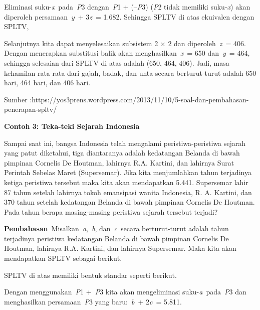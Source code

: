 \documentclass[11pt,fleqn]{book} %
\begin{document}
\begin{myEnumerate}
\begin{itemize}
\noindent 

\noindent 

\noindent Eliminasi suku-\textit{x}~pada~\textit{P}3 dengan~\textit{P}1 + (--\textit{P}3) (\textit{P}2 tidak memiliki suku-\textit{x}) akan diperoleh persamaan~\textit{y}~+ 3\textit{z}~= 1.682. Sehingga SPLTV di atas ekuivalen dengan SPLTV,

\noindent 

\noindent 

\noindent Selanjutnya kita dapat menyelesaikan subsistem 2 $\times$ 2 dan diperoleh~\textit{z}~= 406. Dengan menerapkan substitusi balik akan menghasilkan~\textit{x}~= 650 dan~\textit{y}~= 464, sehingga selesaian dari SPLTV di atas adalah (650, 464, 406). Jadi, masa kehamilan rata-rata dari gajah, badak, dan unta secara berturut-turut adalah 650 hari, 464 hari, dan 406 hari.

\noindent Sumber :https://yos3prens.wordpress.com/2013/11/10/5-soal-dan-pembahasan-penerapan-spltv/

\noindent 

\noindent \textbf{Contoh 3: Teka-teki Sejarah Indonesia}

\noindent Sampai saat ini, bangsa Indonesia telah mengalami peristiwa-peristiwa sejarah yang patut diketahui, tiga diantaranya adalah kedatangan Belanda di bawah pimpinan Cornelis De Houtman, lahirnya R.A. Kartini, dan lahirnya Surat Perintah Sebelas Maret (Supersemar). Jika kita menjumlahkan tahun terjadinya ketiga peristiwa tersebut maka kita akan mendapatkan 5.441. Supersemar lahir 87 tahun setelah lahirnya tokoh emansipasi wanita Indonesia, R. A. Kartini, dan 370 tahun setelah kedatangan Belanda di bawah pimpinan Cornelis De Houtman. Pada tahun berapa masing-masing peristiwa sejarah tersebut terjadi?

\noindent 

\noindent \textbf{Pembahasan}~Misalkan~\textit{a},~\textit{b}, dan~\textit{c}~secara berturut-turut adalah tahun terjadinya peristiwa kedatangan Belanda di bawah pimpinan Cornelis De Houtman, lahirnya R.A. Kartini, dan lahirnya Supersemar. Maka kita akan mendapatkan SPLTV sebagai berikut.

\noindent 

\noindent 

\noindent SPLTV di atas memiliki bentuk standar seperti berikut.

\noindent 

\noindent 

\noindent Dengan menggunakan~\textit{P}1 +~\textit{P}3 kita akan mengeliminasi suku-\textit{a}~pada~\textit{P}3 dan menghasilkan persamaan~\textit{P}3 yang baru:~\textit{b}~+ 2\textit{c}~= 5.811.


\end{itemize}
\end{myEnumerate}
\end{document}
